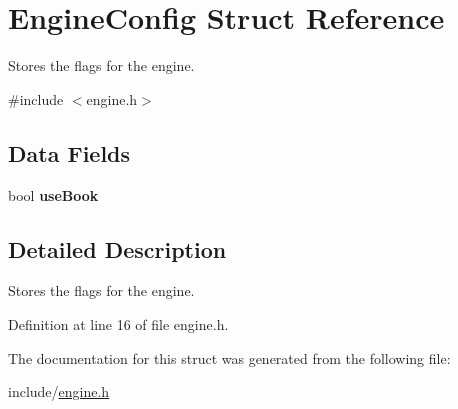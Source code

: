 \hypertarget{structEngineConfig}{}\section{Engine\+Config Struct Reference}
\label{structEngineConfig}


Stores the flags for the engine.  




{\ttfamily \#include $<$engine.\+h$>$}

\subsection*{Data Fields}
\begin{DoxyCompactItemize}
\item 
\mbox{\label{structEngineConfig_a6f6849a5e9919e75b34cd44b8a25a7bf}} 
bool {\bfseries use\+Book}
\end{DoxyCompactItemize}


\subsection{Detailed Description}
Stores the flags for the engine. 

Definition at line 16 of file engine.\+h.



The documentation for this struct was generated from the following file\+:\begin{DoxyCompactItemize}
\item 
include/\mbox{\hyperlink{engine_8h}{engine.\+h}}\end{DoxyCompactItemize}
